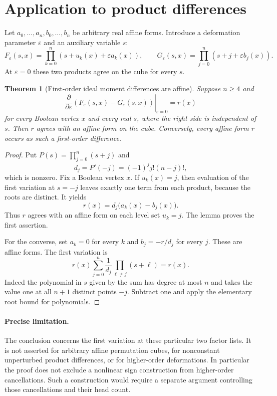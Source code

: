 \documentclass[11pt]{article}
\newtheorem{theorem}{Theorem}
\begin{document}
\section{Application to product differences}

Let $a_0,\ldots,a_n,b_0,\ldots,b_n$ be arbitrary real affine forms.
Introduce a deformation parameter $\varepsilon$ and an auxiliary
variable $s$:
\[
 F_\varepsilon(s,x)=\prod_{k=0}^n(s+u_k(x)+\varepsilon a_k(x)),
 \qquad
 G_\varepsilon(s,x)=\prod_{j=0}^n(s+j+\varepsilon b_j(x)).
\]
At $\varepsilon=0$ these two products agree on the cube for every $s$.

\begin{theorem}[First-order ideal moment differences are affine]
Suppose $n\ge4$ and
\[
 \left.\frac{\partial}{\partial\varepsilon}
 (F_\varepsilon(s,x)-G_\varepsilon(s,x))\right|_{\varepsilon=0}
 =r(x)
\]
for every Boolean vertex $x$ and every real $s$, where the right side
is independent of $s$. Then $r$ agrees with an affine form on the cube.
Conversely, every affine form $r$ occurs as such a first-order difference.
\end{theorem}
\begin{proof}
Put $P(s)=\prod_{j=0}^n(s+j)$ and
\[
 d_j=P'(-j)=(-1)^j j!(n-j)!,
\]
which is nonzero. Fix a Boolean vertex $x$. If $u_k(x)=j$, then
evaluation of the first variation at $s=-j$ leaves exactly one term
from each product, because the roots are distinct. It yields
\[
 r(x)=d_j\bigl(a_k(x)-b_j(x)\bigr).
\]
Thus $r$ agrees with an affine form on each level set $u_k=j$.
The lemma proves the first assertion.

For the converse, set $a_k=0$ for every $k$ and
$b_j=-r/d_j$ for every $j$. These are affine forms. The first
variation is
\[
 r(x)\sum_{j=0}^n\frac{1}{d_j}\prod_{\ell\ne j}(s+\ell)=r(x).
\]
Indeed the polynomial in $s$ given by the sum has degree at most $n$
and takes the value one at all $n+1$ distinct points $-j$. Subtract
one and apply the elementary root bound for polynomials.
\end{proof}

\paragraph{Precise limitation.}
The conclusion concerns the first variation at these particular two
factor lists. It is not asserted for arbitrary affine permutation cubes,
for nonconstant unperturbed product differences, or for higher-order
deformations. In particular the proof does not exclude a nonlinear
sign construction from higher-order cancellations. Such a construction
would require a separate argument controlling those cancellations and
their head count.
\end{document}

